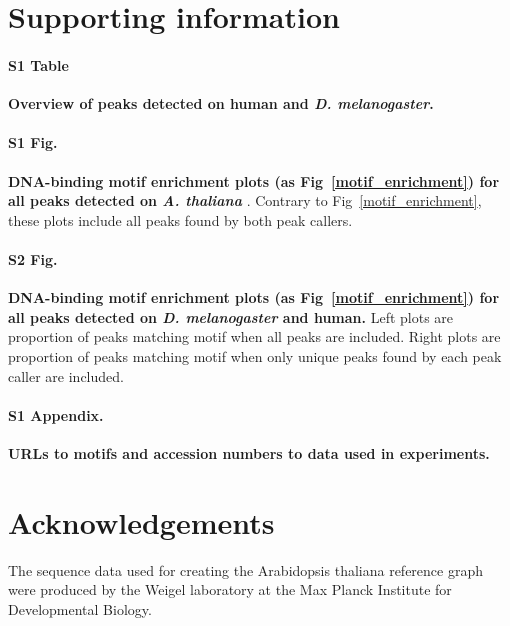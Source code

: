 \documentclass[10pt,letterpaper]{article}
\begin{document}
\section*{Supporting information}

\paragraph*{S1 Table}
\label{S1_Table}
{\bf Overview of peaks detected on human and \emph{D. melanogaster}.}

\paragraph*{S1 Fig.}
\label{S1_Fig}
{\bf DNA-binding motif enrichment plots (as Fig~\ref{motif_enrichment})  for all peaks detected on \emph{A. thaliana} }. Contrary to Fig~\ref{motif_enrichment}, these plots include all peaks found by both peak callers.

\paragraph*{S2 Fig.}
\label{S2s_Fig}
{\bf DNA-binding motif enrichment plots (as Fig~\ref{motif_enrichment}) for all peaks detected on \emph{D. melanogaster} and human.} Left plots are proportion of peaks matching motif when all peaks are included. Right plots are proportion of peaks matching motif when only unique peaks found by each peak caller are included.


\paragraph*{S1 Appendix.}
\label{S1_Appendix}
{\bf URLs to motifs and accession numbers to data used in experiments.}

\section*{Acknowledgements}
The sequence data used for creating the Arabidopsis thaliana reference graph were produced by the Weigel laboratory at the Max Planck Institute for Developmental Biology.

\nolinenumbers

%
%
% 
\end{document}
